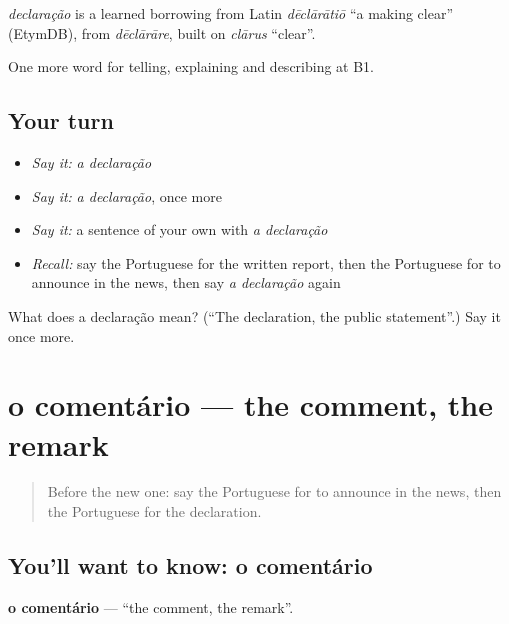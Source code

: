 \begin{cousinweb}
\emph{declaração} is a learned borrowing from Latin \emph{dēclārātiō} \textquotedblleft{}a making clear\textquotedblright{} (EtymDB), from \emph{dēclārāre}, built on \emph{clārus} \textquotedblleft{}clear\textquotedblright{}.
\end{cousinweb}

\begin{grammarlens}[title={What you've built}]
One more word for telling, explaining and describing at B1.
\end{grammarlens}

\subsection*{Your turn}
\begin{itemize}
\raggedright
  \item \emph{Say it:} \emph{a declaração}
  \item \emph{Say it:} \emph{a declaração}, once more
  \item \emph{Say it:} a sentence of your own with \emph{a declaração}
  \item \emph{Recall:} say the Portuguese for the written report, then the Portuguese for to announce in the news, then say \emph{a declaração} again
\end{itemize}

\begin{tcolorbox}[breakable,colback=teal!4,colframe=teal!35!black,title={Before you move on}]
What does a declaração mean? (\textquotedblleft{}The declaration, the public statement\textquotedblright{}.) Say it once more.
\end{tcolorbox}
\section[o comentário]{o comentário — the comment, the remark}

\label{lesson:PT-C282-comentario}



\begin{quote}
Before the new one: say the Portuguese for to announce in the news, then the Portuguese for the declaration.
\end{quote}

\subsection*{You'll want to know: o comentário}
\textbf{o comentário} — \textquotedblleft{}the comment, the remark\textquotedblright{}.

